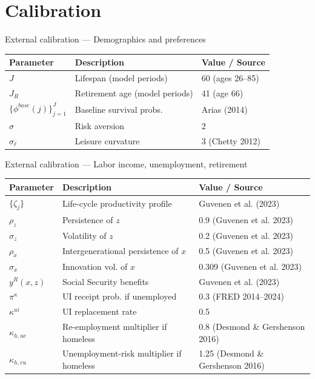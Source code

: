 \documentclass[10pt,aspectratio=169]{beamer}
\begin{document}
\section{Calibration}

\begin{frame}{External calibration --- Demographics and preferences}
\small
\begin{table}
\centering
\begin{tabular}{lll}
\toprule
Parameter & Description & Value / Source\\
\midrule
$J$ & Lifespan (model periods) & 60 (ages 26--85)\\
$J_R$ & Retirement age (model periods) & 41 (age 66)\\
$\{\phi^{base}(j)\}_{j=1}^J$ & Baseline survival probs. & Arias (2014)\\
$\sigma$ & Risk aversion & 2\\
$\sigma_{\ell}$ & Leisure curvature & 3 (Chetty 2012)\\
\bottomrule
\end{tabular}
\end{table}
\end{frame}

\begin{frame}{External calibration --- Labor income, unemployment, retirement}
\small
\begin{table}
\centering
\begin{tabular}{lll}
\toprule
Parameter & Description & Value / Source\\
\midrule
$\{\zeta_j\}$ & Life-cycle productivity profile & Guvenen et al. (2023)\\
$\rho_z$ & Persistence of $z$ & 0.9 (Guvenen et al. 2023)\\
$\sigma_z$ & Volatility of $z$ & 0.2 (Guvenen et al. 2023)\\
$\rho_x$ & Intergenerational persistence of $x$ & 0.5 (Guvenen et al. 2023)\\
$\sigma_x$ & Innovation vol. of $x$ & 0.309 (Guvenen et al. 2023)\\
$y^R(x,z)$ & Social Security benefits & Guvenen et al. (2023)\\
$\pi^{\kappa}$ & UI receipt prob. if unemployed & 0.3 (FRED 2014--2024)\\
$\kappa^{ui}$ & UI replacement rate & 0.5\\
$\kappa_{h,ue}$ & Re-employment multiplier if homeless & 0.8 (Desmond \& Gershenson 2016)\\
$\kappa_{h,eu}$ & Unemployment-risk multiplier if homeless & 1.25 (Desmond \& Gershenson 2016)\\
\bottomrule
\end{tabular}
\end{table}
\end{frame}
\end{document}
